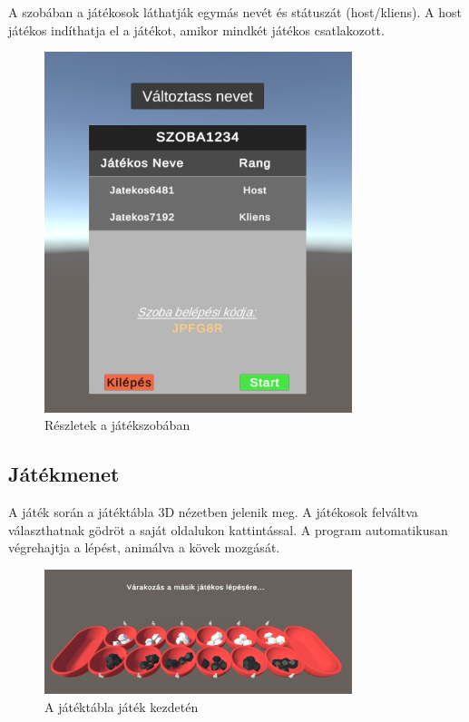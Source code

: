 A szobában a játékosok láthatják egymás nevét és státuszát (host/kliens). A host játékos indíthatja el a játékot, amikor mindkét játékos csatlakozott.

\begin{figure}[h]
	\centering
	\includegraphics[width=0.8\textwidth]{lobby}
	\caption{Részletek a játékszobában}
	\label{fig:lobby-details}
\end{figure}

\subsection{Játékmenet}
A játék során a játéktábla 3D nézetben jelenik meg. A játékosok felváltva választhatnak gödröt a saját oldalukon kattintással. A program automatikusan végrehajtja a lépést, animálva a kövek mozgását.

\begin{figure}[h]
	\centering
	\includegraphics[width=0.8\textwidth]{gamestart}
	\caption{A játéktábla játék kezdetén}
	\label{fig:game-start}
\end{figure}

